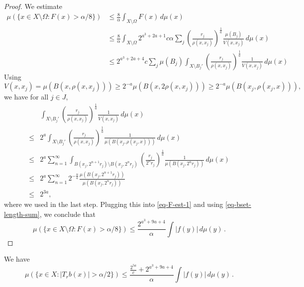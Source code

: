 \begin{proof}
    We estimate
    \begin{align}
        \mu(\{x\in X\setminus\Omega: F(x)> \alpha/8\})
        &\le \frac{8}{\alpha} \int_{X\setminus \Omega} F(x)\,d\mu(x) \\
        &\le \frac{8}{\alpha} \int_{X\setminus \Omega} 2^{a^3+2a+1} c\alpha \sum_{j} \left(\frac{r_j}{\rho(x,x_j)}\right)^{\frac{1}{a}}\frac{\mu(B_j)}{V(x,x_j)}\,d\mu(x) \\
        \label{eq-F-est-1}
        &\le 2^{a^3+2a+4} c \sum_{j} \mu(B_j) \int_{X\setminus B_j'} \left(\frac{r_j}{\rho(x,x_j)}\right)^{\frac{1}{a}}\frac{1}{V(x,x_j)}\,d\mu(x)
    \end{align}
    Using
    \begin{equation*}
        V(x,x_j) = \mu(B(x,\rho(x,x_j))) \ge 2^{-a}\mu(B(x,2\rho(x,x_j))) \ge 2^{-a} \mu(B(x_j,\rho(x_j,x))),
    \end{equation*}
    we have for all $j\in J$,
    \begin{align*}
        &\int_{X\setminus B_j'} \left(\frac{r_j}{\rho(x,x_j)}\right)^{\frac{1}{a}}\frac{1}{V(x,x_j)}\,d\mu(x) \\
        \le& 2^a \int_{X\setminus B_j'} \left(\frac{r_j}{\rho(x,x_j)}\right)^{\frac{1}{a}}\frac{1}{\mu(B(x_j,\rho(x_j,x)))}\,d\mu(x) \\
        \le&2^a \sum_{n=1}^\infty \int_{B(x_j,2^{n+1}r_j)\setminus B(x_j,2^n r_j)} \left(\frac{r_j}{2^n r_j}\right)^{\frac{1}{a}}\frac{1}{\mu(B(x_j,2^n r_j))}\,d\mu(x) \\
        \le&2^a \sum_{n=1}^\infty 2^{-\frac{n}{a}} \frac{\mu(B(x_j,2^{n+1}r_j))}{\mu(B(x_j,2^n r_j))} \\
        \le&2^{3a},
    \end{align*}
    where we used  in the last step.
    Plugging this into \eqref{eq-F-est-1} and using \eqref{eq-bset-length-sum}, we conclude that
    \begin{equation*}
        \mu(\{x\in X\setminus\Omega: F(x)> \alpha/8\}) \le \frac{2^{a^3+9a+4}}{\alpha} \int |f(y)|\,d\mu(y)\,.
    \end{equation*}
\end{proof}


\begin{lemma}
    \label{estimate-bad}
    \leanok
    We have
    \begin{equation*}
        \mu\left({\{x\in X: |T_r b(x)|>\alpha/2\}}\right) \le  \frac{\frac{2^{5a}}{c} + 2^{a^3+9a+4}}{\alpha} \int |f(y)|\,d\mu(y) \,.
    \end{equation*}
\end{lemma}


